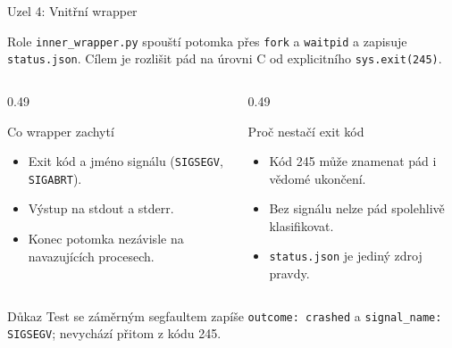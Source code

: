 \documentclass[aspectratio=169,10pt]{beamer}
\begin{document}
\begin{frame}[t]{Uzel 4: Vnitřní wrapper}
  \small
  \begin{block}{Role}
    \texttt{inner\_wrapper.py} spouští potomka přes \texttt{fork} a
    \texttt{waitpid} a zapisuje \texttt{status.json}. Cílem je rozlišit pád na
    úrovni C od explicitního \texttt{sys.exit(245)}.
  \end{block}

  \begin{columns}[T,onlytextwidth]
    \begin{column}{0.49\textwidth}
      \begin{block}{Co wrapper zachytí}
        \begin{itemize}
          \item Exit kód a jméno signálu (\texttt{SIGSEGV}, \texttt{SIGABRT}).
          \item Výstup na stdout a stderr.
          \item Konec potomka nezávisle na navazujících procesech.
        \end{itemize}
      \end{block}
    \end{column}
    \begin{column}{0.49\textwidth}
      \begin{block}{Proč nestačí exit kód}
        \begin{itemize}
          \item Kód 245 může znamenat pád i vědomé ukončení.
          \item Bez signálu nelze pád spolehlivě klasifikovat.
          \item \texttt{status.json} je jediný zdroj pravdy.
        \end{itemize}
      \end{block}
    \end{column}
  \end{columns}

  \begin{alertblock}{Důkaz}
    Test se záměrným segfaultem zapíše \texttt{outcome: crashed} a
    \texttt{signal\_name: SIGSEGV}; nevychází přitom z kódu 245.
  \end{alertblock}
\end{frame}
\end{document}
